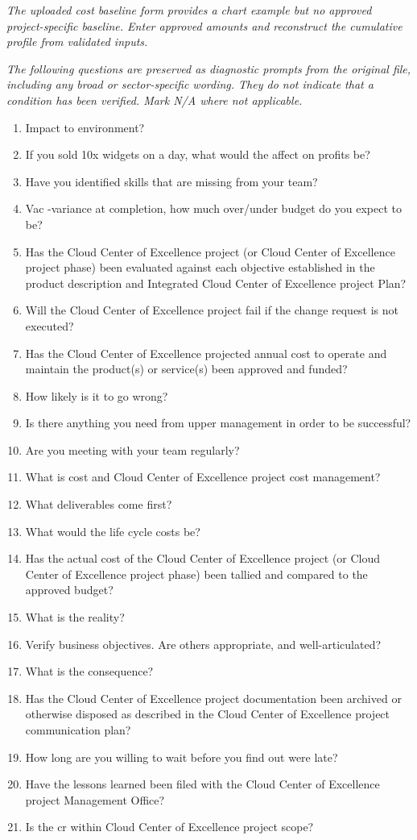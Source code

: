 \documentclass[10pt,letterpaper]{article}
\newcommand{\docsection}[1]{\par\Needspace{5\baselineskip}\vspace{8pt}{\large\sffamily\bfseries\color{navy}#1}\par\vspace{2pt}{\color{rulegrey}\rule{\linewidth}{.6pt}}\par}
\begin{document}
\textit{The uploaded cost baseline form provides a chart example but no approved project-specific baseline. Enter approved amounts and reconstruct the cumulative profile from validated inputs.}
\docsection{03 \quad Source diagnostic checklist}
\textit{The following questions are preserved as diagnostic prompts from the original file, including any broad or sector-specific wording. They do not indicate that a condition has been verified. Mark N/A where not applicable.}
\begingroup\small\begin{enumerate}[leftmargin=2.1em, itemsep=4pt]
\item[1.] Impact to environment?
\item[2.] If you sold 10x widgets on a day, what would the affect on profits be?
\item[3.] Have you identified skills that are missing from your team?
\item[4.] Vac -variance at completion, how much over/under budget do you expect to be?
\item[5.] Has the Cloud Center of Excellence project (or Cloud Center of Excellence project phase) been evaluated against each objective established in the product description and Integrated Cloud Center of Excellence project Plan?
\item[6.] Will the Cloud Center of Excellence project fail if the change request is not executed?
\item[7.] Has the Cloud Center of Excellence projected annual cost to operate and maintain the product(s) or service(s) been approved and funded?
\item[8.] How likely is it to go wrong?
\item[9.] Is there anything you need from upper management in order to be successful?
\item[10.] Are you meeting with your team regularly?
\item[11.] What is cost and Cloud Center of Excellence project cost management?
\item[12.] What deliverables come first?
\item[13.] What would the life cycle costs be?
\item[14.] Has the actual cost of the Cloud Center of Excellence project (or Cloud Center of Excellence project phase) been tallied and compared to the approved budget?
\item[15.] What is the reality?
\item[16.] Verify business objectives. Are others appropriate, and well-articulated?
\item[17.] What is the consequence?
\item[18.] Has the Cloud Center of Excellence project documentation been archived or otherwise disposed as described in the Cloud Center of Excellence project communication plan?
\item[19.] How long are you willing to wait before you find out were late?
\item[20.] Have the lessons learned been filed with the Cloud Center of Excellence project Management Office?
\item[21.] Is the cr within Cloud Center of Excellence project scope?
\end{enumerate}\endgroup
\end{document}
